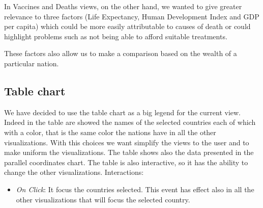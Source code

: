 \documentclass[10pt,conference]{IEEEtran}
\begin{document}
In Vaccines and Deaths views, on the other hand, we wanted to give greater relevance to three factors (Life Expectancy, Human Development Index and GDP per capita) which could be more easily attributable to causes of death or could highlight problems such as not being able to afford suitable treatments.

These factors also allow us to make a comparison based on the wealth of a particular nation.

\begin{figure}
\end{figure}


\subsection{Table chart}
We have decided to use the table chart as a big legend for the current view. Indeed in the table are showed the names of the selected countries each of which with a color, that is the same color the nations have in all the other visualizations. With this choices we want simplify the views to the user and to make uniform the visualizations.
The table shows also the data presented in the parallel coordinates chart. The table is also interactive, so it has the ability to change the other visualizations.
Interactions:
\begin{itemize}
	\item {\em On Click}: It focus the countries selected. This event has effect also in all the other visualizations that will focus the selected country.
\end{itemize}

\begin{figure}
\end{figure}
\end{document}
